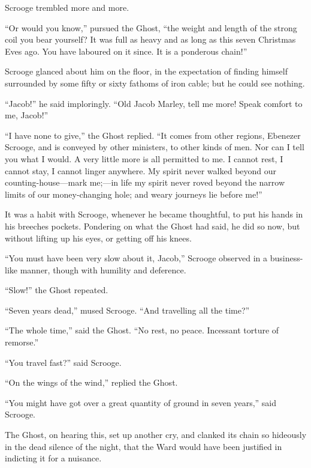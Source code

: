 \documentclass[paper=5.5in:8.5in,BCOR=15mm,twoside,DIV=15,headinclude=off,12pt,chapterprefix=off,openany,headings=huge]{scrbook} %
\begin{document}
Scrooge trembled more and more.

\enquote{Or would you know,} pursued the Ghost, \enquote{the weight and length of the strong coil you bear yourself? It was full as heavy and as long as this seven Christmas Eves ago. You have laboured on it since. It is a ponderous chain!}

Scrooge glanced about him on the floor, in the expectation of finding himself surrounded by some fifty or sixty fathoms of iron cable; but he could see nothing.

\enquote{Jacob!} he said imploringly. \enquote{Old Jacob Marley, tell me more! Speak comfort to me, Jacob!}

\enquote{I have none to give,} the Ghost replied. \enquote{It comes from other regions, Ebenezer Scrooge, and is conveyed by other ministers, to other kinds of men. Nor can I tell you what I would. A very little more is all permitted to me. I cannot rest, I cannot stay, I cannot linger anywhere. My spirit never walked beyond our counting-house—mark me;—in life my spirit never roved beyond the narrow limits of our money-changing hole; and weary journeys lie before me!}

It was a habit with Scrooge, whenever he became thoughtful, to put his hands in his breeches pockets. Pondering on what the Ghost had said, he did so now, but without lifting up his eyes, or getting off his knees.

\enquote{You must have been very slow about it, Jacob,} Scrooge observed in a business-like manner, though with humility and deference.

\enquote{Slow!} the Ghost repeated.

\enquote{Seven years dead,} mused Scrooge. \enquote{And travelling all the time?}

\enquote{The whole time,} said the Ghost. \enquote{No rest, no peace. Incessant torture of remorse.}

\enquote{You travel fast?} said Scrooge.

\enquote{On the wings of the wind,} replied the Ghost. 

\enquote{You might have got over a great quantity of ground in seven years,} said Scrooge.

The Ghost, on hearing this, set up another cry, and clanked its chain so hideously in the dead silence of the night, that the Ward would have been justified in indicting it for a nuisance.
\end{document}
